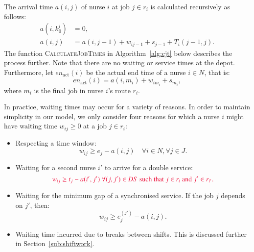\documentclass[a4paper,11pt,authoryear]{elsarticle}
\begin{document}

The arrival time $a(i,j)$ of nurse $i$ at job $j \in r_i$ is calculated recursively as follows:
\begin{subequations}
	\begin{align}
		a(i,k_0^i) &= 0, \label{eq:recursionarrivalbase}\\[3pt]
		a(i,j) &= a(i,j-1) + w_{ij-1} + s_{j-1} + T_i(j-1, j). \label{eq:arrivaltime}
	\end{align}
\end{subequations}
The function \textsc{CalculateJobTimes} in Algorithm~\ref{alg:cjt} below describes the process further. Note that there are no waiting or service times at the depot. Furthermore, let $en_{\text{act}}(i)$ be the actual end time of a nurse $i \in N$, that is:
\begin{equation}
	en_{\text{act}}(i) = a(i,m_i) + w_{im_i} + s_{m_i}, \label{eq:actualendtime}
\end{equation}
where $m_i$ is the final job in nurse $i$'s route $r_i$.


In practice, waiting times may occur for a variety of reasons. In order to maintain simplicity in our model, we only consider four reasons for which a nurse $i$ might have waiting time $w_{ij} \geq 0$ at a job $j \in r_i$:
\begin{itemize}
    \item Respecting a time window: 
    \begin{equation}
        w_{ij} \geq e_j - a(i,j) \quad \forall i \in N, \forall j \in J. \label{eq:waiting1TW}
    \end{equation}
    \item Waiting for a second nurse $i'$ to arrive for a double service:
    \begin{equation}
       \chng{ w_{i j} \geq t_j - a(i',j') \text{ } \forall (j,j') \in DS \text{ such that } j \in r_{i} \text{ and } j' \in r_{i'}.} \label{eq:waiting2DS}
    \end{equation}
    \item Waiting for the minimum gap of a synchronised service. If the job $j$ depends on $j'$, then:
    \begin{equation}\label{eq:waiting3dependent}
        w_{ij} \geq e^{(j')}_{j} - a(i,j).
    \end{equation}
	\item Waiting time incurred due to breaks between shifts. This is discussed further in Section~\ref{sub:shiftwork}.
\end{itemize}
\end{document}
